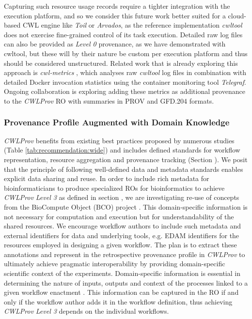 \documentclass[a4paper,num-refs]{oup-contemporary}
\begin{document}
 Capturing such resource usage records require a tighter integration with the execution platform, and so we consider this future work better suited for a cloud-based CWL engine like \textit{Toil} or \textit{Arvados}, as the reference implementation \textit{cwltool} does not exercise fine-grained control of its task execution. Detailed raw log files can also be provided as \textit{Level 0} provenance, as we have demonstrated with cwltool, but these will by their nature be custom per execution platform and thus should be considered unstructured. Related work that is already exploring this approach is \textit{cwl-metrics} \citep{tazro2018}, which analyses raw \textit{cwltool} log files in combination with detailed Docker invocation statistics using the container monitoring tool \textit{Telegraf}. Ongoing collaboration is exploring adding these metrics as additional provenance to the \textit{CWLProv} RO with summaries in PROV and GFD.204 formats.

\subsubsection{\textcolor{black}Provenance Profile Augmented with Domain Knowledge} \label{sec:domainknowledge}
\textit{CWLProv} benefits from existing best practices proposed by numerous studies (Table \ref{tab:recommendation:wide}) and includes defined standards for workflow representation, resource aggregation and provenance tracking (Section \textbf{}). We posit that the principle of following well-defined data and metadata standards enables explicit data sharing and reuse. In order to include rich metadata for bioinformaticians to produce specialized ROs for bioinformatics to achieve \textit{CWLProv} \textit{Level 3} as defined in section \textbf{}, we are investigating re-use of concepts from the BioCompute Object (BCO) project \citep{Alterovitz2019}. This domain-specific information is not necessary for computation and execution but for understandability of the shared resources. We encourage workflow authors to include such metadata and external identifiers for data and underlying tools, e.g. EDAM identifiers for the resources employed in designing a given workflow. The plan is to extract these annotations and represent in the retrospective provenance profile in \textit{CWLProv} to ultimately achieve pragmatic interoperability by providing domain-specific scientific context of the experiments. Domain-specific information is essential in determining the nature of inputs, outputs and context of the processes linked to a given workflow enactment \citep{Alper2018}. This information can be captured in the RO if and only if the workflow author adds it in the workflow definition, thus achieving \textit{CWLProv} \textit{Level 3} depends on the individual workflows. 
\end{document}
